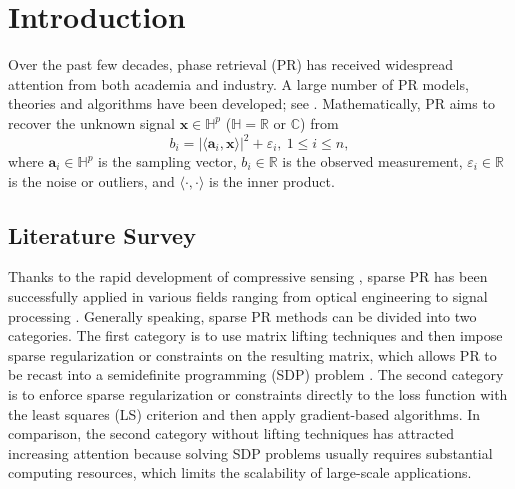\documentclass{article}
\numberwithin{equation}{section}
\begin{document}

\section{Introduction}
	
Over the past few decades, phase retrieval (PR) has received widespread attention from both academia and industry. A large number of PR models, theories and algorithms have been developed; see \cite{grohs2020phase,2015Phase,diederichs2024wirtinger,tu2025deep}. 
Mathematically, PR aims to recover the unknown signal $\mathbf{x}\in \mathbb{H}^p$ ($\mathbb{H}=\mathbb{R}$ or $\mathbb{C}$) from 
\begin{equation}\label{pr}
	b_i=|\langle \mathbf{a}_i, \mathbf{x}\rangle|^2+\varepsilon_i,~1\leq i\leq n,
\end{equation}
where $\mathbf{a}_i\in\mathbb{H}^{p}$ is the sampling vector, $b_i\in \mathbb{R}$ is the observed measurement,  $\varepsilon_i\in\mathbb{R}$ is the noise or outliers, and $\langle \cdot,  \cdot \rangle$ is the inner product. 



	
\subsection{Literature Survey}


Thanks to the rapid development of compressive sensing \cite{donoho2006compressed}, sparse PR has been successfully applied in various fields ranging from optical engineering to signal processing \cite{Yoav2014GESPAR,yang19,cai2023provable}.
Generally speaking, sparse PR methods can be divided into two categories. 
The first category is to use matrix lifting techniques and then impose sparse regularization or constraints on the resulting matrix, which allows PR to be recast into a semidefinite programming (SDP) problem \cite{jaga13}. 
The second category is to enforce sparse regularization or constraints directly to the loss function with the least squares (LS) criterion and then apply gradient-based algorithms. 
In comparison, the second category without lifting techniques has attracted increasing attention because solving SDP problems usually requires substantial computing resources, which limits the scalability of large-scale applications.
\end{document}
